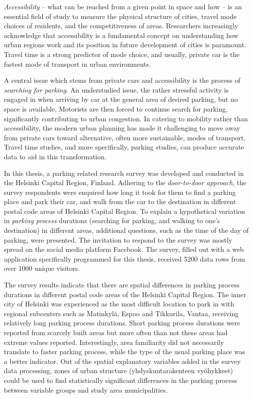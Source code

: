 \justify
\textit{Accessibility} – what can be reached from a given point in space and how – is an essential field of study to measure the physical structure of cities, travel mode choices of residents, and the competitiveness of areas. Researchers increasingly acknowledge that accessibility is a fundamental concept on understanding how urban regions work and its position in future development of cities is paramount. Travel time is a strong predictor of mode choice, and usually, private car is the fastest mode of transport in urban environments. 

A central issue which stems from private cars and accessibility is the process of \textit{searching for parking}. An understudied issue, the rather stressful activity is engaged in when arriving by car at the general area of desired parking, but no space is available. Motorists are then forced to continue search for parking, significantly contributing to urban congestion. In catering to mobility rather than accessibility, the modern urban planning has made it challenging to move away from private cars toward alternative, often more sustainable, modes of transport. Travel time studies, and more specifically, parking studies, can produce accurate data to aid in this transformation.  

In this thesis, a parking related research survey was developed and conducted in the Helsinki Capital Region, Finland. Adhering to the \textit{door-to-door approach}, the survey respondents were enquired how long it took for them to find a parking place and park their car, and walk from the car to the destination in different postal code areas of Helsinki Capital Region. To explain a hypothetical variation in \textit{parking process} durations (searching for parking, and walking to one's destination) in different areas, additional questions, such as the time of the day of parking, were presented. The invitation to respond to the survey was mostly spread on the social media platform Facebook. The survey, filled out with a web application specifically programmed for this thesis, received 5200 data rows from over 1000 unique visitors.

The survey results indicate that there are spatial differences in parking process durations in different postal code areas of the Helsinki Capital Region. The inner city of Helsinki was experienced as the most difficult location to park in with regional subcenters such as Matinkylä, Espoo and Tikkurila, Vantaa, receiving relatively long parking process durations. Short parking process durations were reported from scarcely built areas but more often than not these areas had extreme values reported. Interestingly, area familiarity did not necessarily translate to faster parking process, while the type of the usual parking place was a better indicator. Out of the spatial explanatory variables added in the survey data processing, zones of urban structure (yhdyskuntarakenteen vyöhykkeet) could be used to find statistically significant differences in the parking process between variable groups and study area municipalities.

